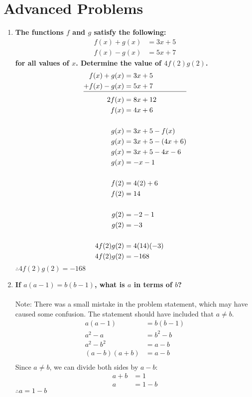 \documentclass[12pt]{article}
\begin{document}
\newpage
\section*{Advanced Problems}
\begin{enumerate}
    \item \textbf{The functions $f$ and $g$ satisfy the following:
    \begin{align*}
        f(x) + g(x) & = 3x + 5 \\
        f(x) - g(x) &= 5x + 7
    \end{align*} for all values of $x$. Determine the value of $4f(2)g(2)$.} \\
    \begin{align*}
        f(x) + g(x) & = 3x + 5 \\
        + f(x) - g(x) &= 5x + 7 \\[-10pt]
        \cline{1-2}
        2f(x) &= 8x+12 \\
        f(x) &= 4x+6 \\ \\
        g(x) &= 3x+5-f(x) \\
        g(x) &= 3x+5-(4x+6) \\
        g(x) &= 3x+5-4x-6 \\
        g(x) &= -x-1 \\ \\
        f(2) &= 4(2)+6 \\
        f(2) &= 14 \\ \\
        g(2) &= -2-1 \\
        g(2) &= -3 \\ \\
        4f(2)g(2) &= 4(14)(-3) \\
        4f(2)g(2) &= -168
    \end{align*}
    $\therefore 4f(2)g(2) = -168$ 
    
    \item \textbf{If $a(a - 1) = b(b - 1)$, what is $a$ in terms of $b$?} \\ \\
    Note: There was a small mistake in the problem statement, which may have caused some confusion. The statement should have included that $a \neq b$.
        \begin{align*}
        a(a-1) &= b(b-1) \\
        a^2-a &= b^2-b \\
        a^2-b^2 &= a-b \\
        (a-b)(a+b) &= a-b \\
    \end{align*}
    Since $a \neq b$, we can divide both sides by $a-b$:
    \begin{align*}
        a+b &= 1 \\
        a & = 1 - b
    \end{align*}
    $\therefore a = 1-b$


\end{enumerate}
\end{document}
